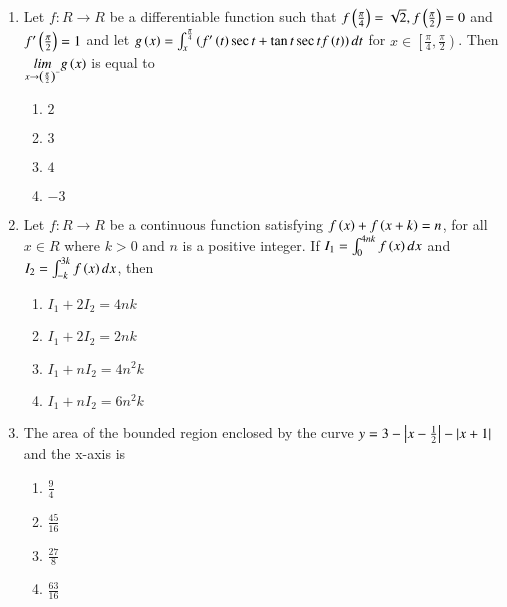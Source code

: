\documentclass[journal]{IEEEtran}
\begin{document}
\begin{enumerate}
    \item Let $f:R\to R$ be a differentiable function such that $f\left(\frac{\pi}{4}\right)=\sqrt{2},f\left(\frac{\pi}{2}\right)=0$ and $f'\left(\frac{\pi}{2}\right)=1$ and let $g\left(x\right)=\int_x^{\frac{\pi}{4}}\left(f'\left(t\right)\sec t+\tan t\sec tf\left(t\right)\right)dt$ for $x\in \left[ \frac{\pi}{4},\frac{\pi}{2}\right)$. Then $\underset{x\to\left(\frac{\pi}{2}\right)^{-}}{lim}g\left(x\right)$ is equal to

        \begin{multicols}{4}
            \begin{enumerate}
                \item $2$
                \item $3$
                \item $4$
                \item $-3$
            \end{enumerate}
        \end{multicols}
		
    \item Let $f:R\to R$ be a continuous function satisfying $f\left(x\right)+f\left(x+k\right)=n$, for all $x\in R$ where $k>0$ and $n$ is a positive integer. If $I_1=\int_0^{4nk}f\left(x\right)dx$ and $I_2=\int_{-k}^{3k}f\left(x\right)dx$, then

        \begin{multicols}{4}
            \begin{enumerate}
                \item $I_1+2I_2=4nk$
                \item $I_1+2I_2=2nk$
                \item $I_1+nI_2=4n^2k$
                \item $I_1+nI_2=6n^2k$
            \end{enumerate}
        \end{multicols}

    \item The area of the bounded region enclosed by the curve $y=3-\left\vert x-\frac{1}{2}\right\vert-\left\vert x+1\right\vert$ and the x-axis is

        \begin{multicols}{4}
            \begin{enumerate}
                \item $\frac{9}{4}$
                \item $\frac{45}{16}$
                \item $\frac{27}{8}$
                \item $\frac{63}{16}$
            \end{enumerate}
        \end{multicols}


\end{enumerate}
\end{document}
